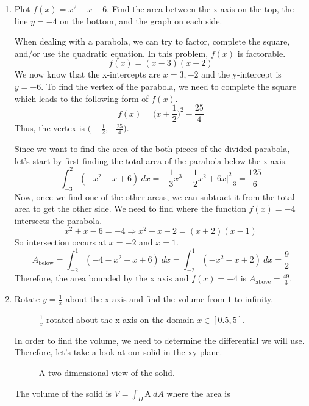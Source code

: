 \begin{enumerate}
\item
  Plot \(f(x) = x^2 + x - 6\).
  Find the area between the x axis on the top, the line \(y = -4\) on the
  bottom, and the graph on each side.
  \par\smallskip
  When dealing with a parabola, we can try to factor, complete the square,
  and/or use the quadratic equation.
  In this problem, \(f(x)\) is factorable.
  \[
  f(x) = (x - 3)(x + 2)
  \]
  We now know that the x-intercepts are \(x = 3, -2\) and the y-intercept is
  \(y = -6\).
  To find the vertex of the parabola, we need to complete the square which leads
  to the following form of \(f(x)\).
  \[
  f(x) = \Big(x + \frac{1}{2}\Big)^2 - \frac{25}{4}
  \]
  Thus, the vertex is \(\big(-\frac{1}{2}, -\frac{25}{4}\big)\).
  \begin{figure}[H]
    \centering
    
    \caption{}
  \end{figure}
  Since we want to find the area of the both pieces of the divided parabola,
  let's start by first finding the total area of the parabola below the x
  axis.
  \[
  \int_{-3}^2(-x^2 - x + 6) \ dx =
  -\frac{1}{3}x^3 - \frac{1}{2}x^2 + 6x\Big|_{-3}^2 = \frac{125}{6}
  \]
  Now, once we find one of the other areas, we can subtract it from the total
  area to get the other side.
  We need to find where the function \(f(x) = -4\) intersects the parabola.
  \[
  x^2 + x - 6 = -4\Rightarrow x^2 + x - 2 = (x + 2)(x - 1)
  \]
  So intersection occurs at \(x = -2\) and \(x = 1\).
  \[
  A_{\text{below}} = \int_{-2}^1(-4 - x^2 - x + 6) \ dx =
  \int_{-2}^1(-x^2 - x + 2) \ dx = \frac{9}{2}
  \]
  Therefore, the area bounded by the x axis and \(f(x) = -4\) is
  \(A_{\text{above}} = \frac{49}{3}\).
\item
  Rotate \(y = \frac{1}{x}\) about the x axis and find the volume from \(1\)
  to infinity.
  \begin{figure}[H]
    \centering
    
    \caption{\(\frac{1}{x}\) rotated about the x axis on the domain
      \(x\in[0.5, 5]\).}
  \end{figure}
  In order to find the volume, we need to determine the differential we will
  use.
  Therefore, let's take a look at our solid in the xy plane.
  \begin{figure}[H]
    \centering
    
    \caption{A two dimensional view of the solid.}
  \end{figure}
  The volume of the solid is \(V = \int_D\text{A} \ dA\) where the area is

\end{enumerate}
